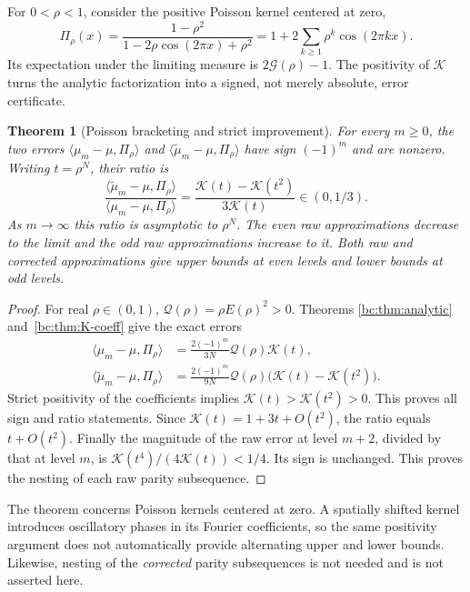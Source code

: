 \documentclass[11pt,a4paper,oneside,openany]{book}
\numberwithin{equation}{chapter}
\newtheorem{theorem}{Theorem}[chapter]
\theoremstyle{definition}
\theoremstyle{remark}
\newcommand{\pair}[2]{\langle #1,#2\rangle}
\newcommand{\mt}{\widetilde\mu}
\begin{document}
For $0<\rho<1$, consider the positive Poisson kernel centered at zero,
\begin{equation}
 \Pi_\rho(x)=\frac{1-\rho^2}{1-2\rho\cos(2\pi x)+\rho^2}
 =1+2\sum_{k\ge1}\rho^k\cos(2\pi kx).
 \label{bc:eq:poisson}
\end{equation}
Its expectation under the limiting measure is $2\mathcal G(\rho)-1$. The positivity
of $\mathcal K$ turns the analytic factorization into a signed, not merely absolute,
error certificate.

\begin{theorem}[Poisson bracketing and strict improvement]
\label{bc:thm:poisson}
For every $m\ge0$, the two errors
$\pair{\mu_m-\mu}{\Pi_\rho}$ and
$\pair{\mt_m-\mu}{\Pi_\rho}$ have sign $(-1)^m$ and are nonzero.
Writing $t=\rho^N$, their ratio is
\begin{equation}
 \frac{\pair{\mt_m-\mu}{\Pi_\rho}}
      {\pair{\mu_m-\mu}{\Pi_\rho}}
 =\frac{\mathcal K(t)-\mathcal K(t^2)}{3\mathcal K(t)}\in(0,1/3).
 \label{bc:eq:poisson-ratio}
\end{equation}
As $m\to\infty$ this ratio is asymptotic to $\rho^N$.
The even raw approximations decrease to the limit and the odd raw approximations
increase to it. Both raw and corrected approximations give upper bounds at even
levels and lower bounds at odd levels.
\end{theorem}
\begin{proof}
For real $\rho\in(0,1)$, $\mathcal Q(\rho)=\rho E(\rho)^2>0$. Theorems
\ref{bc:thm:analytic} and~\ref{bc:thm:K-coeff} give the exact errors
\begin{align}
 \pair{\mu_m-\mu}{\Pi_\rho}
 &=\frac{2(-1)^m}{3N}\mathcal Q(\rho)\mathcal K(t),\label{bc:eq:raw-poisson}\\
 \pair{\mt_m-\mu}{\Pi_\rho}
 &=\frac{2(-1)^m}{9N}\mathcal Q(\rho)\bigl(\mathcal K(t)-\mathcal K(t^2)\bigr).
 \label{bc:eq:corrected-poisson}
\end{align}
Strict positivity of the coefficients implies $\mathcal K(t)>\mathcal K(t^2)>0$. This proves
all sign and ratio statements. Since $\mathcal K(t)=1+3t+O(t^2)$, the ratio equals
$t+O(t^2)$. Finally the magnitude of the raw error at level $m+2$, divided by
that at level $m$, is $\mathcal K(t^4)/(4\mathcal K(t))<1/4$. Its sign is unchanged. This proves
the nesting of each raw parity subsequence.
\end{proof}

The theorem concerns Poisson kernels centered at zero. A spatially shifted kernel
introduces oscillatory phases in its Fourier coefficients, so the same positivity
argument does not automatically provide alternating upper and lower bounds.
Likewise, nesting of the \emph{corrected} parity subsequences is not needed and
is not asserted here.
\end{document}
